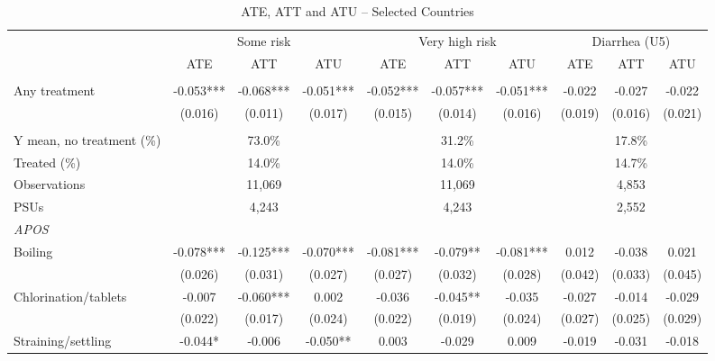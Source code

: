 \documentclass[10pt]{article}
\begin{document}
\clearpage
\begin{table}[H]
\centering
\caption{ATE, ATT and ATU -- Selected Countries}
\label{tab:ate-att-atu-selected-countries-clustered-aggregated}
\scriptsize
\setlength{\tabcolsep}{4pt}
\renewcommand{\arraystretch}{0.92}
\begin{adjustbox}{max width=\linewidth}
\begin{tabular}{lccccccccc}
\hline\hline
 & \multicolumn{3}{c}{Some risk} & \multicolumn{3}{c}{Very high risk} & \multicolumn{3}{c}{Diarrhea (U5)} \\
\cmidrule(lr){2-4}\cmidrule(lr){5-7}\cmidrule(lr){8-10}
 & ATE & ATT & ATU & ATE & ATT & ATU & ATE & ATT & ATU \\
\addlinespace[3pt]
\multicolumn{10}{l}{\textit{IRM}} \\
Any treatment & -0.053*** & -0.068*** & -0.051*** & -0.052*** & -0.057*** & -0.051*** & -0.022 & -0.027 & -0.022 \\
 & (0.016) & (0.011) & (0.017) & (0.015) & (0.014) & (0.016) & (0.019) & (0.016) & (0.021) \\
\addlinespace[6pt]
\multicolumn{10}{l}{\textit{Descriptive statistics and sample}} \\
Y mean, no treatment (\%) & \multicolumn{3}{c}{73.0\%} & \multicolumn{3}{c}{31.2\%} & \multicolumn{3}{c}{17.8\%} \\
Treated (\%) & \multicolumn{3}{c}{14.0\%} & \multicolumn{3}{c}{14.0\%} & \multicolumn{3}{c}{14.7\%} \\
Observations & \multicolumn{3}{c}{11,069} & \multicolumn{3}{c}{11,069} & \multicolumn{3}{c}{4,853} \\
PSUs & \multicolumn{3}{c}{4,243} & \multicolumn{3}{c}{4,243} & \multicolumn{3}{c}{2,552} \\
\midrule
\multicolumn{10}{l}{\textit{APOS}} \\
Boiling & -0.078*** & -0.125*** & -0.070*** & -0.081*** & -0.079** & -0.081*** & 0.012 & -0.038 & 0.021 \\
 & (0.026) & (0.031) & (0.027) & (0.027) & (0.032) & (0.028) & (0.042) & (0.033) & (0.045) \\
Chlorination/tablets & -0.007 & -0.060*** & 0.002 & -0.036 & -0.045** & -0.035 & -0.027 & -0.014 & -0.029 \\
 & (0.022) & (0.017) & (0.024) & (0.022) & (0.019) & (0.024) & (0.027) & (0.025) & (0.029) \\
Straining/settling & -0.044* & -0.006 & -0.050** & 0.003 & -0.029 & 0.009 & -0.019 & -0.031 & -0.018 \\

\end{tabular}
\end{adjustbox}
\end{table}
\end{document}
